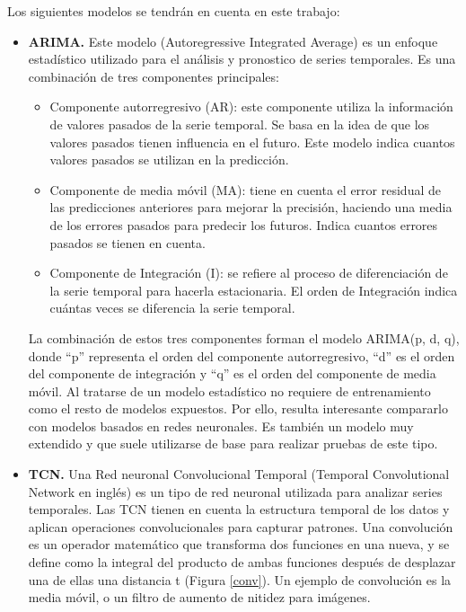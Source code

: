 Los siguientes modelos se tendrán en cuenta en este trabajo:
\begin{itemize}
    \item \textbf{ARIMA.} Este modelo (Autoregressive Integrated Average) \cite{hyndman2018forecasting} es un enfoque estadístico utilizado para 
        el análisis y pronostico de series temporales. Es una combinación de tres componentes principales:
        \begin{itemize}
            \item Componente autorregresivo (AR): este componente utiliza la información de valores pasados de la
                serie temporal. Se basa en la idea de que los valores pasados tienen influencia en el futuro. Este 
                modelo indica cuantos valores pasados se utilizan en la predicción.
            \item Componente de media móvil (MA): tiene en cuenta el error residual de las predicciones anteriores 
                para mejorar la precisión, haciendo una media de los errores pasados para predecir los futuros. 
                Indica cuantos errores pasados se tienen en cuenta.
            \item Componente de Integración (I): se refiere al proceso de diferenciación de la serie temporal para 
                hacerla estacionaria. El orden de Integración indica cuántas veces se diferencia la serie temporal.
        \end{itemize}
        La combinación de estos tres componentes forman el modelo ARIMA(p, d, q), donde ``p'' representa el orden 
        del componente autorregresivo, ``d'' es el orden del componente de integración y ``q'' es el orden del componente 
        de media móvil.
        Al tratarse de un modelo estadístico no requiere de entrenamiento como el resto de modelos expuestos. Por ello, 
        resulta interesante compararlo con modelos basados en redes neuronales. Es también un modelo muy extendido y 
        que suele utilizarse de base para realizar pruebas de este tipo.
    \item \textbf{TCN.} Una Red neuronal Convolucional Temporal (Temporal Convolutional Network en inglés) \cite{DBLP:journals/corr/abs-1803-01271} es un tipo de 
        red neuronal utilizada para analizar series temporales. Las TCN tienen en cuenta la estructura temporal de los datos 
        y aplican operaciones convolucionales para capturar patrones. Una convolución \cite{hirschman2012convolution} es un operador matemático que transforma 
        dos funciones en una nueva, y se define como la integral del producto de ambas funciones después de desplazar una de ellas 
        una distancia t (Figura \ref{conv}). Un ejemplo de convolución es la media móvil, o un filtro de aumento de nitidez para imágenes.


\end{itemize}
